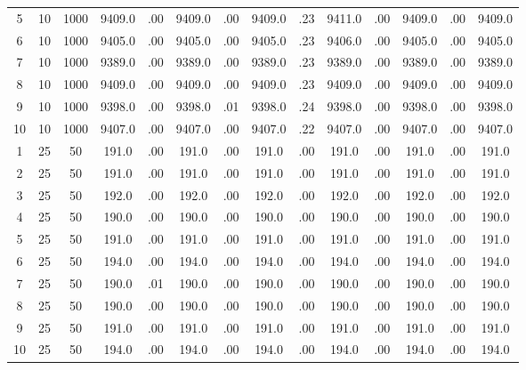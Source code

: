 \documentclass[12pt,a4paper]{article}
\begin{document}
\begin{center}
{\begin{tabular}{|ccc|cc|cc|cc|cc|cc|c|}
5             &  10&1000&   9409.0&  .00&   9409.0&  .00&   9409.0&  .23&   9411.0&  .00&   9409.0&  .00&   9409.0\\[-0.01in]
6             &  10&1000&   9405.0&  .00&   9405.0&  .00&   9405.0&  .23&   9406.0&  .00&   9405.0&  .00&   9405.0\\[-0.01in]
7             &  10&1000&   9389.0&  .00&   9389.0&  .00&   9389.0&  .23&   9389.0&  .00&   9389.0&  .00&   9389.0\\[-0.01in]
8             &  10&1000&   9409.0&  .00&   9409.0&  .00&   9409.0&  .23&   9409.0&  .00&   9409.0&  .00&   9409.0\\[-0.01in]
9             &  10&1000&   9398.0&  .00&   9398.0&  .01&   9398.0&  .24&   9398.0&  .00&   9398.0&  .00&   9398.0\\[-0.01in]
10            &  10&1000&   9407.0&  .00&   9407.0&  .00&   9407.0&  .22&   9407.0&  .00&   9407.0&  .00&   9407.0\\[-0.01in]
1             &  25&  50&    191.0&  .00&    191.0&  .00&    191.0&  .00&    191.0&  .00&    191.0&  .00&    191.0\\[-0.01in]
2             &  25&  50&    191.0&  .00&    191.0&  .00&    191.0&  .00&    191.0&  .00&    191.0&  .00&    191.0\\[-0.01in]
3             &  25&  50&    192.0&  .00&    192.0&  .00&    192.0&  .00&    192.0&  .00&    192.0&  .00&    192.0\\[-0.01in]
4             &  25&  50&    190.0&  .00&    190.0&  .00&    190.0&  .00&    190.0&  .00&    190.0&  .00&    190.0\\[-0.01in]
5             &  25&  50&    191.0&  .00&    191.0&  .00&    191.0&  .00&    191.0&  .00&    191.0&  .00&    191.0\\[-0.01in]
6             &  25&  50&    194.0&  .00&    194.0&  .00&    194.0&  .00&    194.0&  .00&    194.0&  .00&    194.0\\[-0.01in]
7             &  25&  50&    190.0&  .01&    190.0&  .00&    190.0&  .00&    190.0&  .00&    190.0&  .00&    190.0\\[-0.01in]
8             &  25&  50&    190.0&  .00&    190.0&  .00&    190.0&  .00&    190.0&  .00&    190.0&  .00&    190.0\\[-0.01in]
9             &  25&  50&    191.0&  .00&    191.0&  .00&    191.0&  .00&    191.0&  .00&    191.0&  .00&    191.0\\[-0.01in]
10            &  25&  50&    194.0&  .00&    194.0&  .00&    194.0&  .00&    194.0&  .00&    194.0&  .00&    194.0\\[-0.01in]

\end{tabular}}
\end{center}
\end{document}
